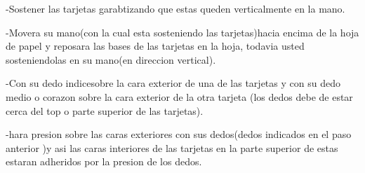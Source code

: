 \documentclass{article}
\begin{document}
    -Sostener las tarjetas garabtizando que estas queden verticalmente en la mano.
    
    -Movera su mano(con la cual esta sosteniendo las tarjetas)hacia encima de la hoja de papel y reposara las bases de las tarjetas en la hoja, todavia    usted sosteniendolas en su mano(en direccion vertical).
    
    -Con su dedo indicesobre la cara exterior de una de las tarjetas y con su dedo medio o corazon sobre la cara exterior de la otra tarjeta (los dedos debe de estar cerca del top o parte superior de las tarjetas).
    
    -hara presion sobre las caras exteriores con sus dedos(dedos indicados en el paso anterior )y asi las caras interiores de las tarjetas en la parte superior de estas estaran adheridos por la presion de los dedos.
\end{document}
